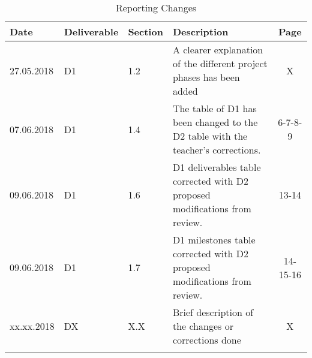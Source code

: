 \begin{longtable}[H]{l l l p{7cm} c}
	
	\toprule[2pt]
	
	\textbf{Date} & \textbf{Deliverable} & \textbf{Section} &  \textbf{Description} & \textbf{Page} \\
	
	\midrule[1.5pt] 
	\endhead
	
	27.05.2018 & D1 & 1.2  & A clearer explanation of the different project phases has been added & X \vspace{0.2cm} \\
	
	\midrule

	07.06.2018 & D1 & 1.4  & The table of D1 has been changed to the D2 table with the teacher's corrections. & 6-7-8-9 \vspace{0.2cm} \\
	
	\midrule

	09.06.2018 & D1 & 1.6  & D1 deliverables table corrected with D2 proposed modifications from review. & 13-14 \vspace{0.2cm} \\
	
	\midrule

	09.06.2018 & D1 & 1.7  & D1 milestones table corrected with D2 proposed modifications from review. & 14-15-16 \vspace{0.2cm} \\
	
	\midrule
		
	xx.xx.2018 & DX & X.X  & Brief description of the changes or corrections done & X \vspace{0.2cm} \\
	
	\bottomrule[2pt]
	
	\caption{Reporting Changes}
\end{longtable}

